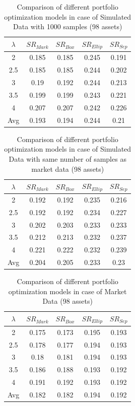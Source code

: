 \documentclass[12pt]{article}
\numberwithin{equation}{section}
\begin{document}
\begin{table}[h]
\centering
\captionsetup{justification=centering}
\begin{tabular}{||c|c|c|c|c||}
\hline
$\lambda$ & $SR_{Mark}$ & $SR_{Box}$ & $SR_{Ellip}$ & $SR_{Sep}$ \\
\hline
2 & 0.185 & 0.185 & 0.245 & 0.191 \\
2.5 & 0.185 & 0.185 & 0.244 & 0.202 \\
3 & 0.19 & 0.192 & 0.244 & 0.213 \\
3.5 & 0.199 & 0.199 & 0.243 & 0.221 \\
4 & 0.207 & 0.207 & 0.242 & 0.226 \\
\hline
Avg & 0.193 & 0.194 & 0.244 & 0.21 \\
\hline
\end{tabular}
\caption{Comparison of different portfolio optimization models in case of Simulated Data with 1000 samples (98 assets)}
\label{tab:4}
\end{table}

\begin{table}[h]
\centering
\captionsetup{justification=centering}
\begin{tabular}{||c|c|c|c|c||}
\hline
$\lambda$ & $SR_{Mark}$ & $SR_{Box}$ & $SR_{Ellip}$ & $SR_{Sep}$ \\
\hline
2 & 0.192 & 0.192 & 0.235 & 0.216 \\
2.5 & 0.192 & 0.192 & 0.234 & 0.227 \\
3 & 0.202 & 0.203 & 0.233 & 0.233 \\
3.5 & 0.212 & 0.213 & 0.232 & 0.237 \\
4 & 0.221 & 0.222 & 0.232 & 0.239 \\
\hline
Avg & 0.204 & 0.205 & 0.233 & 0.23 \\
\hline
\end{tabular}
\caption{Comparison of different portfolio optimization models in case of Simulated Data with same number of samples as market data (98 assets)}
\label{tab:5}
\end{table}

\begin{table}[h]
\centering
\captionsetup{justification=centering}
\begin{tabular}{||c|c|c|c|c||}
\hline
$\lambda$ & $SR_{Mark}$ & $SR_{Box}$ & $SR_{Ellip}$ & $SR_{Sep}$ \\
\hline
2 & 0.175 & 0.173 & 0.195 & 0.193 \\
2.5 & 0.178 & 0.177 & 0.194 & 0.193 \\
3 & 0.18 & 0.181 & 0.194 & 0.193 \\
3.5 & 0.186 & 0.188 & 0.193 & 0.192 \\
4 & 0.191 & 0.192 & 0.193 & 0.192 \\
\hline
Avg & 0.182 & 0.182 & 0.194 & 0.192 \\
\hline
\end{tabular}
\caption{Comparison of different portfolio optimization models in case of Market Data (98 assets)}
\label{tab:6}
\end{table}
\end{document}
